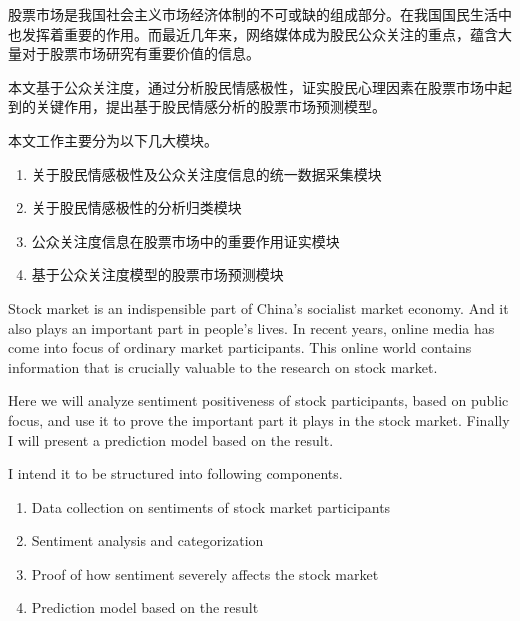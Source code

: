 \begin{cabstract}
  股票市场是我国社会主义市场经济体制的不可或缺的组成部分。在我国国民生活中也发挥着重要的作用。而最近几年来，网络媒体成为股民公众关注的重点，蕴含大量对于股票市场研究有重要价值的信息。

  本文基于公众关注度，通过分析股民情感极性，证实股民心理因素在股票市场中起到的关键作用，提出基于股民情感分析的股票市场预测模型。

  本文工作主要分为以下几大模块。

  \begin{enumerate}
    \item 关于股民情感极性及公众关注度信息的统一数据采集模块
    \item 关于股民情感极性的分析归类模块
    \item 公众关注度信息在股票市场中的重要作用证实模块
    \item 基于公众关注度模型的股票市场预测模块
  \end{enumerate}
\end{cabstract}


\begin{eabstract}
  Stock market is an indispensible part of China's socialist market economy. And it also plays an important part in people's lives. In recent years, online media has come into focus of ordinary market participants. This online world contains information that is crucially valuable to the research on stock market.

  Here we will analyze sentiment positiveness of stock participants, based on public focus, and use it to prove the important part it plays in the stock market. Finally I will present a prediction model based on the result.

  I intend it to be structured into following components.

  \begin{enumerate}
    \item Data collection on sentiments of stock market participants
    \item Sentiment analysis and categorization
    \item Proof of how sentiment severely affects the stock market
    \item Prediction model based on the result
  \end{enumerate}
\end{eabstract}

